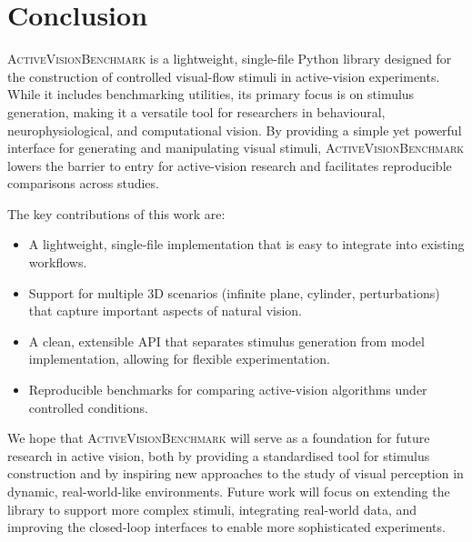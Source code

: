 \documentclass[12pt,a4paper]{article}
\newcommand{\avb}{\textsc{ActiveVisionBenchmark}}  %
\begin{document}
\section{Conclusion}
\label{sec:conclusion}

\avb{} is a lightweight, single-file Python library designed for the construction of controlled visual-flow stimuli in active-vision experiments. While it includes benchmarking utilities, its primary focus is on stimulus generation, making it a versatile tool for researchers in behavioural, neurophysiological, and computational vision. By providing a simple yet powerful interface for generating and manipulating visual stimuli, \avb{} lowers the barrier to entry for active-vision research and facilitates reproducible comparisons across studies.

The key contributions of this work are:
\begin{itemize}
    \item A lightweight, single-file implementation that is easy to integrate into existing workflows.
    \item Support for multiple 3D scenarios (infinite plane, cylinder, perturbations) that capture important aspects of natural vision.
    \item A clean, extensible API that separates stimulus generation from model implementation, allowing for flexible experimentation.
    \item Reproducible benchmarks for comparing active-vision algorithms under controlled conditions.
\end{itemize}

We hope that \avb{} will serve as a foundation for future research in active vision, both by providing a standardised tool for stimulus construction and by inspiring new approaches to the study of visual perception in dynamic, real-world-like environments. Future work will focus on extending the library to support more complex stimuli, integrating real-world data, and improving the closed-loop interfaces to enable more sophisticated experiments.

\printbibliography[title=References]
\end{document}
